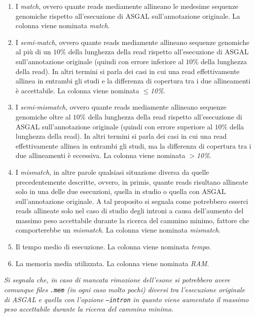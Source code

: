 \documentclass[a4paper,12pt, oneside]{book}
\begin{document}
\begin{enumerate}
  \item I \textit{match}, ovvero quante reads mediamente allineano le medesime
  sequenze genomiche rispetto all'esecuzione di ASGAL sull'annotazione
  originale. La colonna viene nominata \textit{match}.
  \item I \textit{semi-match}, ovvero quante reads mediamente allineano
  sequenze genomiche al più di un $10\%$ della lunghezza della read rispetto
  all'esecuzione di ASGAL sull'annotazione originale (quindi con errore
  inferiore al $10\%$ della lunghezza della read). In altri termini si parla
  dei casi in cui una read effettivamente allinea in entrambi gli studi e
  la differenza di copertura tra i due allineamenti è accettabile. La colonna
  viene nominata \textit{$\leq$10\%}. 
  \item I \textit{semi-mismatch}, ovvero quante reads mediamente allineano
  sequenze genomiche oltre al $10\%$ della lunghezza della read rispetto
  all'esecuzione di ASGAL sull'annotazione originale (quindi con errore
  superiore al $10\%$ della lunghezza della read). In altri termini si parla
  dei casi in cui una read effettivamente allinea in entrambi gli studi, ma
  la differenza di copertura tra i due allineamenti è eccessiva. La colonna
  viene nominata \textit{$>$10\%}.
  \item I \textit{mismatch}, in altre parole qualsiasi situazione diversa da
  quelle 
  precedentemente descritte, ovvero, in primis, quante reads 
  risultano allineate solo in una delle due esecuzioni, quella in studio o
  quella con ASGAL sull'annotazione originale. A tal
  proposito si segnala come potrebbero esserci reads allineate solo nel caso di
  studio degli introni a causa dell'aumento del massimo peso accettabile durante
  la ricerca del cammino minimo, fattore che comporterebbe un
  \textit{mismatch}. La 
  colonna viene nominata \textit{mismatch}.
  \item Il tempo medio di esecuzione. La colonna viene nominata \textit{tempo}.
  \item La memoria media utilizzata. La colonna viene nominata \textit{RAM}.
\end{enumerate}
\textit{Si segnala che, in caso di mancata rimozione dell'esone si potrebbero
  avere comunque files \texttt{.mem} (in ogni caso molto pochi) diversi tra
  l'esecuzione originale di ASGAL e quella con l'opzione \texttt{--intron} in
  quanto viene aumentato il massimo peso accettabile durante la ricerca del
  cammino minimo.}\\ 
\end{document}
